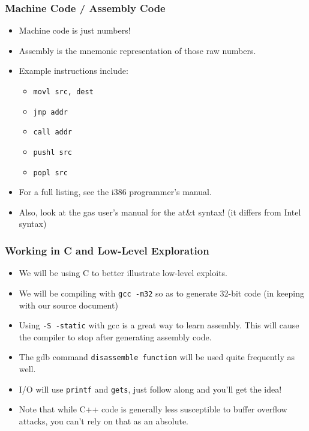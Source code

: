 \documentclass{beamer}
\begin{document}
\begin{frame}
    \frametitle{Machine Code / Assembly Code}
    \begin{itemize}[<+->]
        \item Machine code is just numbers!
        \item Assembly is the mnemonic representation of those raw numbers.
        \item Example instructions include:
        \begin{itemize}
            \item {\tt movl src, dest}
            \item {\tt jmp addr}
            \item {\tt call addr}
            \item {\tt pushl src}
            \item {\tt popl src}
        \end{itemize}
        \item For a full listing, see the i386 programmer's manual.
        \item Also, look at the gas user's manual for the at\&t syntax!  (it differs from Intel syntax)
    \end{itemize}
\end{frame}

\begin{frame}
    \frametitle{Working in C and Low-Level Exploration}
    \begin{itemize}
        \item We will be using C to better illustrate low-level exploits.
        \item We will be compiling with {\tt gcc -m32} so as to generate 32-bit code (in keeping with our source document)
        \item Using {\tt -S -static} with gcc is a great way to learn assembly.  This will cause the compiler to stop after generating assembly code.
        \item The gdb command {\tt disassemble function} will be used quite frequently as well.
        \item I/O will use {\tt printf} and {\tt gets}, just follow along and you'll get the idea!
        \item Note that while C++ code is generally less susceptible to buffer overflow attacks, you can't rely on that as an absolute.
    \end{itemize}
\end{frame}
\end{document}
